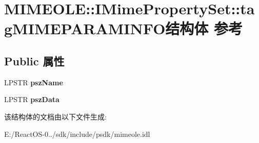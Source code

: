 \hypertarget{struct_m_i_m_e_o_l_e_1_1_i_mime_property_set_1_1tag_m_i_m_e_p_a_r_a_m_i_n_f_o}{}\section{M\+I\+M\+E\+O\+LE\+:\+:I\+Mime\+Property\+Set\+:\+:tag\+M\+I\+M\+E\+P\+A\+R\+A\+M\+I\+N\+F\+O结构体 参考}
\label{struct_m_i_m_e_o_l_e_1_1_i_mime_property_set_1_1tag_m_i_m_e_p_a_r_a_m_i_n_f_o}
\subsection*{Public 属性}
\begin{DoxyCompactItemize}
\item 
\mbox{\label{struct_m_i_m_e_o_l_e_1_1_i_mime_property_set_1_1tag_m_i_m_e_p_a_r_a_m_i_n_f_o_ac6a841e1feacec2aa8fa79c2646d76ac}} 
L\+P\+S\+TR {\bfseries psz\+Name}
\item 
\mbox{\label{struct_m_i_m_e_o_l_e_1_1_i_mime_property_set_1_1tag_m_i_m_e_p_a_r_a_m_i_n_f_o_a40e3bc0c7964d4e6ec28154d3be8234b}} 
L\+P\+S\+TR {\bfseries psz\+Data}
\end{DoxyCompactItemize}


该结构体的文档由以下文件生成\+:\begin{DoxyCompactItemize}
\item 
E\+:/\+React\+O\+S-\/0../sdk/include/psdk/mimeole.\+idl\end{DoxyCompactItemize}
